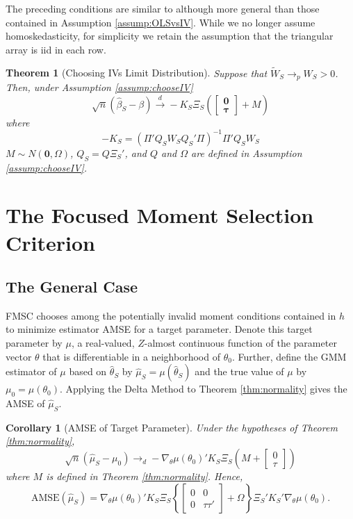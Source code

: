 \documentclass[12pt]{article}
\newtheorem{thm}{Theorem}[section]
\newtheorem{cor}{Corollary}[section]
\theoremstyle{definition}
\begin{document}
The preceding conditions are similar to although more general than those contained in Assumption \ref{assump:OLSvsIV}. 
While we no longer assume homoskedasticity, for simplicity we retain the assumption that the triangular array is iid in each row. 

\begin{thm}[Choosing IVs Limit Distribution]
\label{thm:chooseIV} Suppose that $\widetilde{W}_S \rightarrow_p W_S >0$. Then, under Assumption \ref{assump:chooseIV}
$$\sqrt{n}\left(\widehat{\beta}_S - \beta \right) \overset{d}{\rightarrow} -K_S \Xi_S \left(\left[\begin{array}
           {c} \mathbf{0} \\ \boldsymbol{\tau}
         \end{array}\right] + M \right)$$
where
         $$-K_S = \left(\Pi' Q_S W_S Q_S'\Pi\right)^{-1} \Pi'Q_SW_S$$
$M \sim N(\mathbf{0}, \Omega)$, $Q_S = Q \Xi_S'$, and $Q$ and $\Omega$ are defined in Assumption \ref{assump:chooseIV}.
\end{thm}



\section{The Focused Moment Selection Criterion}
\label{sec:FMSC}

\subsection{The General Case}
FMSC chooses among the potentially invalid moment conditions contained in $h$ to minimize estimator AMSE for a target parameter. 
Denote this target parameter by $\mu$, a real-valued, $Z$-almost continuous function of the parameter vector $\theta$ that is differentiable in a neighborhood of $\theta_0$. 
Further, define the GMM estimator of $\mu$ based on $\widehat{\theta}_S$ by $\widehat{\mu}_S = \mu(\widehat{\theta}_S)$ and the true value of $\mu$ by $\mu_0 = \mu(\theta_0)$. 
Applying the Delta Method to Theorem \ref{thm:normality} gives the AMSE of $\widehat{\mu}_S$.

\begin{cor}[AMSE of Target Parameter]
\label{cor:target}
Under the hypotheses of Theorem \ref{thm:normality}, 
$$\sqrt{n}\left(\widehat{\mu}_S - \mu_0\right)\rightarrow_d-\nabla_\theta\mu(\theta_0)'K_S \Xi_S \left(M +  \left[\begin{array}
	{c} 0 \\ \tau
\end{array} \right]\right)$$ 
where $M$ is defined in Theorem \ref{thm:normality}.
Hence,
	$$\mbox{AMSE}\left(\widehat{\mu}_S\right) = \nabla_\theta\mu(\theta_0)'K_S \Xi_S \left\{\left[\begin{array}{cc}0&0\\0&\tau\tau'\end{array}\right] + \Omega\right\}\Xi_S'K_S'\nabla_\theta\mu(\theta_0).$$
\end{cor}
\end{document}

